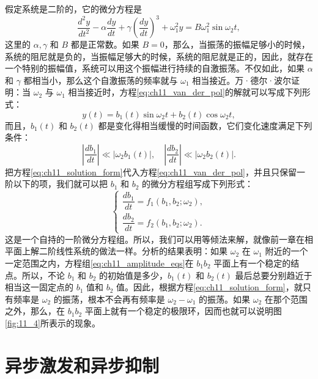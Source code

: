 假定系统是二阶的，它的微分方程是
\begin{equation}\label{eq:ch11_van_der_pol}
\frac{d^2y}{dt^2} - \alpha \frac{dy}{dt} + \gamma \left( \frac{dy}{dt} \right)^3 + \omega_1^2 y = B\omega_1^2 \sin \omega_2 t,
\end{equation}
这里的 $\alpha, \gamma$ 和 $B$ 都是正常数。如果 $B=0$，那么，当振荡的振幅足够小的时候，系统的阻尼就是负的，当振幅足够大的时候，系统的阻尼就是正的，因此，就存在一个特别的振幅值，系统可以用这个振幅进行持续的自激振荡。不仅如此，如果 $\alpha$ 和 $\gamma$ 都相当小，那么这个自激振荡的频率就与 $\omega_1$ 相当接近。万·德尔·波尔证明：当 $\omega_2$ 与 $\omega_1$ 相当接近时，方程\eqref{eq:ch11_van_der_pol}的解就可以写成下列形式：
\begin{equation}\label{eq:ch11_solution_form}
y(t) = b_1(t) \sin \omega_2 t + b_2(t) \cos \omega_2 t,
\end{equation}
而且，$b_1(t)$ 和 $b_2(t)$ 都是变化得相当缓慢的时间函数，它们变化速度满足下列条件：
\begin{equation*}
\left| \frac{db_1}{dt} \right| \ll |\omega_2 b_1(t)|, \quad \left| \frac{db_2}{dt} \right| \ll |\omega_2 b_2(t)|.
\end{equation*}
把方程\eqref{eq:ch11_solution_form}代入方程\eqref{eq:ch11_van_der_pol}，并且只保留一阶以下的项，我们就可以把 $b_1$ 和 $b_2$ 的微分方程组写成下列形式：
\begin{equation}\label{eq:ch11_amplitude_eqs}
\begin{cases}
\dfrac{db_1}{dt} = f_1(b_1, b_2; \omega_2), \\[6pt]
\dfrac{db_2}{dt} = f_2(b_1, b_2; \omega_2).
\end{cases}
\end{equation}
这是一个自持的一阶微分方程组。所以，我们可以用等倾法来解，就像前一章在相平面上解二阶线性系统的做法一样。分析的结果表明：如果 $\omega_2$ 在 $\omega_1$ 附近的一个一定范围之内，方程组\eqref{eq:ch11_amplitude_eqs}在 $b_1b_2$ 平面上有一个稳定的结点。所以，不论 $b_1$ 和 $b_2$ 的初始值是多少，$b_1(t)$ 和 $b_2(t)$ 最后总要分别趋近于相当这一固定点的 $b_1$ 值和 $b_2$ 值。因此，根据方程\eqref{eq:ch11_solution_form}，就只有频率是 $\omega_2$ 的振荡，根本不会再有频率是 $\omega_2 - \omega_1$ 的振荡。如果 $\omega_2$ 在那个范围之外，那么，在 $b_1b_2$ 平面上就有一个稳定的极限环，因而也就可以说明图\ref{fig:11_4}所表示的现象。


\section{异步激发和异步抑制}


